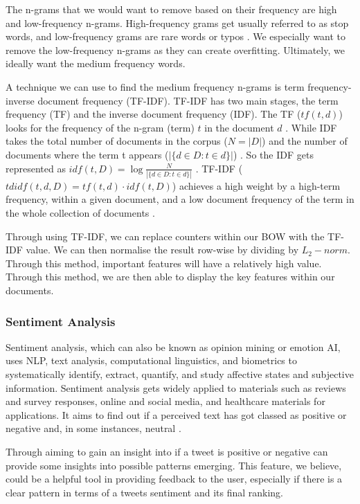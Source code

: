 	The n-grams that we would want to remove based on their frequency are high and low-frequency n-grams. High-frequency grams get usually referred to as stop words, and low-frequency grams are rare words or typos \cite{hapke2019natural}. We especially want to remove the low-frequency n-grams as they can create overfitting. Ultimately, we ideally want the medium frequency words.
	
	A technique we can use to find the medium frequency n-grams is term frequency-inverse document frequency (TF-IDF). TF-IDF has two main stages, the term frequency (TF) and the inverse document frequency (IDF). The TF ($tf(t,d)$) looks for the frequency of the n-gram (term) $t$ in the document $d$ \cite{sarkar2016text}. While IDF takes the total number of documents in the corpus ($N = |D|$) and the number of documents where the term t appears ($|\{d \in D:t \in d\}|$) \cite{sarkar2016text}. So the IDF gets represented as $idf(t,D) = \log\frac{N}{|\{d \in D:t \in d\}|}$ \cite{sarkar2016text}. TF-IDF ($tdidf(t,d,D) = tf(t,d) \cdot idf(t,D)$) achieves a high weight by a high-term frequency, within a given document, and a low  document frequency of the term in the whole collection of documents \cite{sarkar2016text}.
	
	Through using TF-IDF, we can replace counters within our BOW with the TF-IDF value. We can then normalise the result row-wise by dividing by $L_2-norm$. Through this method, important features will have a relatively high value. Through this method, we are then able to display the key features within our documents.
	
	
	\subsubsection{Sentiment Analysis}
	Sentiment analysis, which can also be known as opinion mining or emotion AI, uses NLP, text analysis, computational linguistics, and biometrics to systematically identify, extract, quantify, and study affective states and subjective information. Sentiment analysis gets widely applied to materials such as reviews and survey responses, online and social media, and healthcare materials for applications. It aims to find out if a perceived text has got classed as positive or negative and, in some instances, neutral \cite{geron2019hands, bird2009natural}.
	
	Through aiming to gain an insight into if a tweet is positive or negative can provide some insights into possible patterns emerging. This feature, we believe, could be a helpful tool in providing feedback to the user, especially if there is a clear pattern in terms of a tweets sentiment and its final ranking.
	
